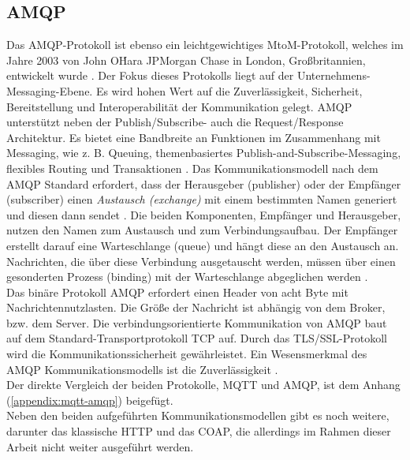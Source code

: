     \subsection{AMQP}
    \label{subsec:amqp}
        Das \ac{AMQP}-Protokoll ist ebenso ein leichtgewichtiges \acs{MtoM}-Protokoll, welches im Jahre 2003 von John O\'Hara JPMorgan Chase 
        in London, Großbritannien, entwickelt wurde \cite{Naik2017}. Der Fokus dieses Protokolls liegt auf der Unternehmens-Messaging-Ebene. 
        Es wird hohen Wert auf die Zuverlässigkeit, Sicherheit, Bereitstellung und Interoperabilität der Kommunikation gelegt. \acs{AMQP} 
        unterstützt neben der Publish/Subscribe- auch die Request/Response Architektur. Es bietet eine Bandbreite an 
        Funktionen im Zusammenhang mit Messaging, wie z. B. Queuing, themenbasiertes Publish-and-Subscribe-Messaging, 
        flexibles Routing und Transaktionen \cite{Naik2017}. Das Kommunikationsmodell nach dem \acs{AMQP} Standard erfordert, dass der 
        Herausgeber (publisher) oder der Empfänger (subscriber) einen \textit{Austausch (exchange)} mit einem bestimmten Namen generiert 
        und diesen dann sendet \cite{Naik2017}. Die beiden Komponenten, Empfänger und Herausgeber, nutzen den Namen zum Austausch und zum 
        Verbindungsaufbau. Der Empfänger erstellt darauf eine Warteschlange (queue) und hängt diese an den Austausch an. Nachrichten, die 
        über diese Verbindung ausgetauscht werden, müssen über einen gesonderten Prozess (binding) mit der Warteschlange abgeglichen werden 
        \cite{Naik2017}.
        \\ 
        Das binäre Protokoll \acs{AMQP} erfordert einen Header von acht Byte mit Nachrichtennutzlasten. Die Größe der Nachricht ist abhängig 
        von dem Broker, bzw. dem Server. Die verbindungsorientierte Kommunikation von \acs{AMQP} baut auf dem Standard-Transportprotokoll 
        \acs{TCP} auf. Durch das \acs{TLS}/\acs{SSL}-Protokoll wird die Kommunikationssicherheit gewährleistet. Ein Wesensmerkmal des \acs{AMQP} 
        Kommunikationsmodells ist die Zuverlässigkeit \cite{Naik2017}. 
        \\
        \linebreak
        Der direkte Vergleich der beiden Protokolle, \acs{MQTT} und \acs{AMQP}, ist dem Anhang (\ref{appendix:mqtt-amqp}) beigefügt.
        \\
        \linebreak
        Neben den beiden aufgeführten Kommunikationsmodellen gibt es noch weitere, darunter das klassische \ac{HTTP} und das \ac{COAP}, die allerdings 
        im Rahmen dieser Arbeit nicht weiter ausgeführt werden. 

